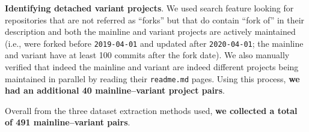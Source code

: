 \nd \textbf{Identifying detached variant projects}. We used \gh search feature looking for repositories that are not referred as ``forks'' but that do contain ``fork of'' in their description and both the mainline and variant projects are actively maintained (i.e., were forked before \texttt{2019-04-01} and updated after \texttt{2020-04-01}; the mainline and variant have at least 100 commits after the fork date). We also manually verified that indeed the mainline and variant are indeed different projects being maintained in parallel by reading their \texttt{readme.md} pages. Using this process, \textbf{we had an additional 40 mainline–variant project pairs}.

\nd Overall from the three dataset extraction methods used, \textbf{we collected a total of 491 mainline--variant pairs}.



